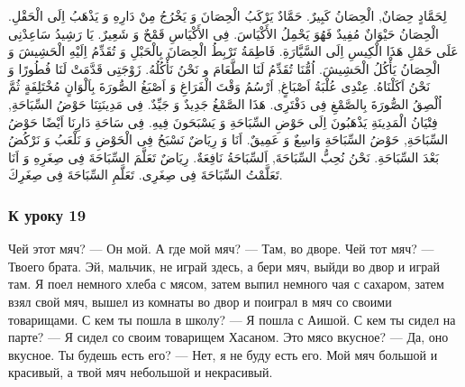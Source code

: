 \documentclass[a5paper]{article}
\begin{document}
لِحَمَّادٍ حِصَانٌ, الْحِصَانُ كَبِيرٌ. حَمَّادٌ يَرْكَبُ الْحِصَانَ وَ يَخْرُجُ مِنْ دَارِهِ وَ يَذْهَبُ اِلَى الْحَقْلِ. الْحِصَانُ حَيْوَانٌ مُفِيدٌ فَهُوَ يَحْمِلُ الأَكْيَاسَ. فِى الأَكْيَاسِ قَمْحٌ وَ شَعِيرٌ. يَا رَشِيدُ سَاعِدْنِى عَلَى حَمْلِ هَذَا الْكِيسِ اِلَى السَّيَّارَةِ. فَاطِمَةُ تَرْبِطُ الْحِصَانَ بِالْحَبْلِ وَ تُقَدِّمُ اِلَيْهِ الْحَشِيشَ وَ الْحِصَانُ يَأْكُلُ الْحَشِيشَ. اُمُّنَا تُقَدِّمُ لَنَا الطَّعَامَ و نَحْنُ نَأْكُلُهُ. زَوْجَتِى قَدَّمَتْ لَنَا فُطُورًا وَ نَحْنُ اَكَلْنَاهُ. عِنْدِى عُلْبَةُ اَصْبَاغٍ, اَرْسُمُ وَقْتَ الْفَرَاغِ وَ اَصْبَغُ الصُّورَةَ بِاَلْوَانٍ مُخْتَلِفَةٍ ثُمَّ اُلْصِقُ الصُّورَةَ بِالصَّمْغِ فِى دَفْتَرِى. هَذَا الصَّمْغُ جَدِيدٌ وَ جَيِّدٌ. فِى مَدِينَتِنَا حَوْضُ السِّبَاحَةِ, فِتْيَانُ الْمَدِينَةِ يَذْهَبُونَ اِلَى حَوْضِ السِّبَاحَةِ وَ يَسْبَحَونَ فِيهِ. فِى سَاحَةِ دَارِنَا اَيْضًا حَوْضُ السِّبَاحَةِ, حَوْضُ السِّبَاحَةِ وَاسِعٌ وَ عَمِيقٌ. اَنَا وَ رِيَاضٌ نَسْبَحُ فِى الْحَوْضِ وَ نَلْعَبُ وَ نَرْكُضُ بَعْدَ السِّبَاحَةِ. نَحْنُ نُحِبُّ السِّبَاحَةَ, اَلسِّبَاحَةُ نَافِعَةٌ. رِيَاضٌ تَعَلَّمَ السِّبَاحَةَ فِى صِغَرِهِ وَ اَنَا تَعَلَّمْتُ السِّبَاحَةَ فِى صِغَرِى. تَعَلَّمِ السِّبَاحَةَ فِى صِغَرِكَ.

\subsubsection{К уроку 19}
Чей этот мяч? — Он мой. А где мой мяч? — Там, во дворе. Чей тот мяч? — Твоего брата. Эй, мальчик, не играй здесь, а бери мяч, выйди во двор и играй там. Я поел немного хлеба с мясом, затем выпил немного чая с сахаром, затем взял свой мяч, вышел из комнаты во двор и поиграл в мяч со своими товарищами. С кем ты пошла в школу? — Я пошла с Аишой. С кем ты сидел на парте? — Я сидел со своим товарищем Хасаном. Это мясо вкусное? — Да, оно вкусное. Ты будешь есть его? — Нет, я не буду есть его. Мой мяч большой и красивый, а твой мяч небольшой и некрасивый.
\end{document}
